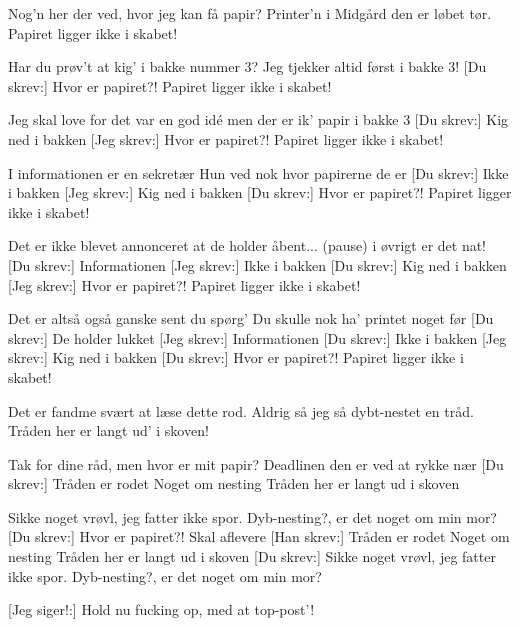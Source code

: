 \documentclass[a4paper,11pt]{article}
\begin{document}
\begin{song}
Nog'n her der ved, hvor jeg kan få papir?
Printer'n i Midgård den er løbet tør.
Papiret ligger ikke i skabet!

Har du prøv't at kig' i bakke nummer 3?
Jeg tjekker altid først i bakke 3!
[Du skrev:]
       Hvor er papiret?!
       Papiret ligger ikke i skabet!

Jeg skal love for det var en god idé
men der er ik' papir i bakke 3
[Du skrev:]
       Kig ned i bakken
       [Jeg skrev:]
               Hvor er papiret?!
               Papiret ligger ikke i skabet!

I informationen er en sekretær
Hun ved nok hvor papirerne de er
[Du skrev:]
       Ikke i bakken
       [Jeg skrev:]
               Kig ned i bakken
               [Du skrev:]
                       Hvor er papiret?!
                       Papiret ligger ikke i skabet!

Det er ikke blevet annonceret at
de holder åbent... (pause) i øvrigt er det nat!
[Du skrev:]
       Informationen
       [Jeg skrev:]
               Ikke i bakken
               [Du skrev:]
                       Kig ned i bakken
                       [Jeg skrev:]
                               Hvor er papiret?!
                               Papiret ligger ikke i skabet!

Det er altså også ganske sent du spørg'
Du skulle nok ha' printet noget før
[Du skrev:]
       De holder lukket
       [Jeg skrev:]
               Informationen
               [Du skrev:]
                       Ikke i bakken
                       [Jeg skrev:]
                               Kig ned i bakken
                               [Du skrev:]
                                       Hvor er papiret?!
                                       Papiret ligger ikke i skabet!

Det er fandme svært at læse dette rod.
Aldrig så jeg så dybt-nestet en tråd.
Tråden her er langt ud' i skoven!

Tak for dine råd, men hvor er mit papir?
Deadlinen den er ved at rykke nær
[Du skrev:]
       Tråden er rodet
       Noget om nesting
       Tråden her er langt ud i skoven

Sikke noget vrøvl, jeg fatter ikke spor.
Dyb-nesting?, er det noget om min mor?
[Du skrev:]
       Hvor er papiret?!
       Skal aflevere
       [Han skrev:]
               Tråden er rodet
               Noget om nesting
               Tråden her er langt ud i skoven
[Du skrev:]
Sikke noget vrøvl, jeg fatter ikke spor.
Dyb-nesting?, er det noget om min mor?

[Jeg siger!:]
Hold nu fucking op, med at top-post'!

\end{song}
\end{document}
